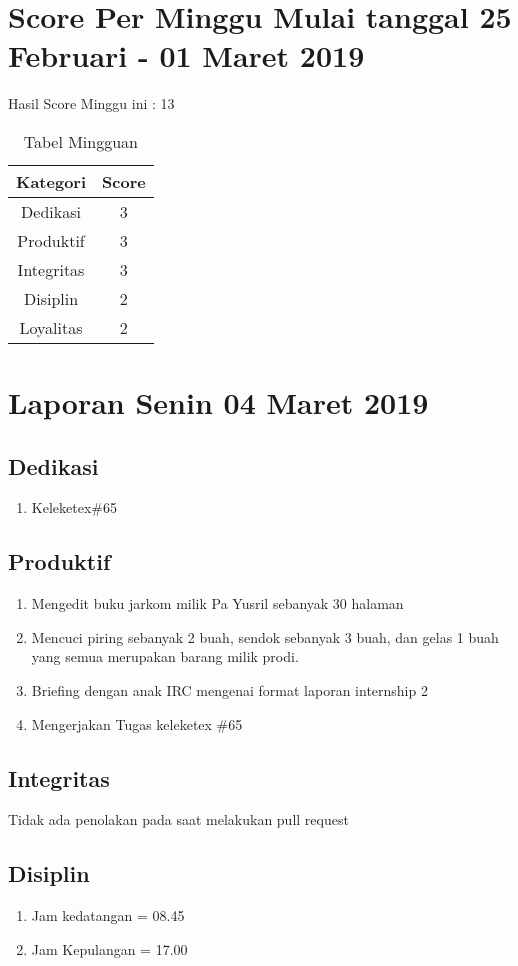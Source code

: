 \section {Score Per Minggu Mulai tanggal 25 Februari - 01 Maret 2019}
Hasil Score Minggu ini : 13
\begin{table}[h]
\caption{Tabel Mingguan}
\centering
\begin{tabular}{|c|c|}
\hline
\textbf{Kategori}&\textbf{Score}\\
\hline
Dedikasi&3\\
\hline
Produktif&3\\
\hline
Integritas&3\\
\hline
Disiplin&2\\
\hline
Loyalitas&2\\
\hline
\end{tabular}
\label{tsble:Laporan mingguan}
\end{table}


\section{Laporan Senin 04 Maret 2019}
\subsection{Dedikasi}
\begin{enumerate}
\item Keleketex\#65
\end{enumerate}
\subsection{Produktif}
\begin{enumerate}
\item Mengedit buku jarkom milik Pa Yusril sebanyak 30 halaman
\item Mencuci piring sebanyak 2 buah, sendok sebanyak 3 buah, dan gelas 1 buah yang semua merupakan barang milik prodi.
\item  Briefing dengan anak IRC mengenai format laporan internship 2
\item Mengerjakan Tugas keleketex \#65
\end {enumerate}
\subsection{Integritas}
Tidak ada penolakan pada saat melakukan pull request
\subsection{Disiplin}
\begin{enumerate}
\item Jam kedatangan = 08.45
\item Jam Kepulangan = 17.00
\end{enumerate}
